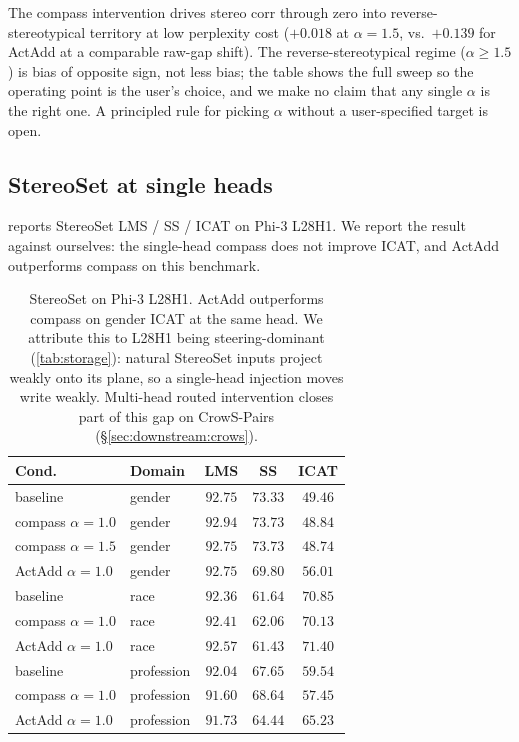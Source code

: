 The compass intervention drives stereo corr through zero into
reverse-stereotypical territory at low perplexity cost
($+0.018$ at $\alpha = 1.5$, vs.\ $+0.139$ for ActAdd at a
comparable raw-gap shift). The reverse-stereotypical regime
($\alpha \geq 1.5$) is bias of opposite sign, not less bias; the
table shows the full sweep so the operating point is the user's
choice, and we make no claim that any single $\alpha$ is the right
one. A principled rule for picking $\alpha$ without a user-specified
target is open.

\subsection{StereoSet at single heads}
\label{sec:downstream:stereoset}

 reports StereoSet LMS / SS / ICAT on Phi-3
L28H1. We report the result against ourselves: the single-head compass does not
improve ICAT, and ActAdd outperforms compass on this benchmark.

\begin{table}[t]
\centering
\small
\caption{StereoSet on Phi-3 L28H1. ActAdd outperforms compass on
gender ICAT at the same head. We attribute this to L28H1 being
steering-dominant (\cref{tab:storage}): natural StereoSet inputs
project weakly onto its plane, so a single-head injection moves
write weakly. Multi-head routed intervention closes part of this gap
on CrowS-Pairs (\S\ref{sec:downstream:crows}).}
\label{tab:stereoset}
\begin{tabular}{llccc}
\toprule
Cond.\ & Domain & LMS & SS & ICAT \\
\midrule
baseline & gender & $92.75$ & $73.33$ & $49.46$ \\
compass $\alpha{=}1.0$ & gender & $92.94$ & $73.73$ & $48.84$ \\
compass $\alpha{=}1.5$ & gender & $92.75$ & $73.73$ & $48.74$ \\
ActAdd $\alpha{=}1.0$  & gender & $92.75$ & $69.80$ & $\mathbf{56.01}$ \\
\midrule
baseline & race   & $92.36$ & $61.64$ & $70.85$ \\
compass $\alpha{=}1.0$ & race   & $92.41$ & $62.06$ & $70.13$ \\
ActAdd $\alpha{=}1.0$  & race   & $92.57$ & $61.43$ & $71.40$ \\
\midrule
baseline & profession & $92.04$ & $67.65$ & $59.54$ \\
compass $\alpha{=}1.0$ & profession & $91.60$ & $68.64$ & $57.45$ \\
ActAdd $\alpha{=}1.0$  & profession & $91.73$ & $64.44$ & $\mathbf{65.23}$ \\
\bottomrule
\end{tabular}
\end{table}

